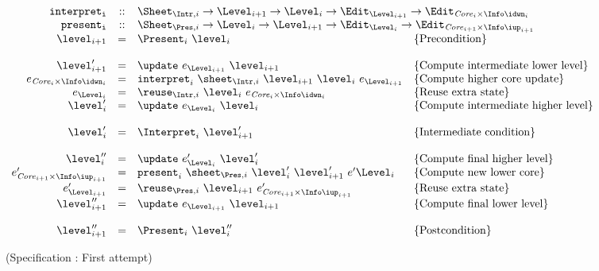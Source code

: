 \begin{small}
 \label{spec:combinationFirstAttempt}
\( \begin{array}{rcll}  
{\tt interpret_i}  & :: & \multicolumn{2}{l}{\Sheet_{\Intr,i} \rightarrow \Level_{i+1} \rightarrow \Level_{i} \rightarrow  \Edit_{\Level_{i+1}} \rightarrow \Edit_{\Core_{i}\times \Info\idwn_{i}} } \\
{\tt present_i} & :: & \multicolumn{2}{l}{ \Sheet_{\Pres,i} \rightarrow \Level_{i} \rightarrow \Level_{i+1}  \rightarrow \Edit_{\Level_{i}} \rightarrow \Edit_{\Core_{i+1}\times \Info\iup_{i+1}} } \\
\level_{i+1} 	& = & \Present_{i}~\level_{i}						& \text{\{Precondition\}}\\
\\
\level'_{i+1} 	& = & \update~e_{\Level_{i+1}}~\level_{i+1}                 & \text{\{Compute intermediate lower level\}}\\
e_{\Core_{i} \times \Info\idwn_{i}}  & = & \interpret_{i}~\sheet_{\Intr,i}~\level_{i+1}~\level_{i}~e_{\Level_{i+1}} & \text{\{Compute higher core update\}}\\
e_{\Level_{i}} & = & \reuse_{\Intr,i}~\level_{i}~e_{\Core_{i}\times \Info\idwn_{i}}     & \text{\{Reuse extra state\}}\\
\level'_{i} & = & \update~e_{\Level_{i}}~\level_{i}                 & \text{\{Compute intermediate higher level\}}\\
\\\
\level'_{i} & = & \Interpret_{i}~\level'_{i+1}						& \text{\{Intermediate condition\}}\\
\\
\level''_{i} & = & \update~e'_{\Level_{i}}~\level'_{i}                 & \text{\{Compute final higher level\}}\\
e'_{\Core_{i+1}\times \Info\iup_{i+1}}  & = & \present_{i}~\sheet_{\Pres,i}~\level'_{i}~\level'_{i+1}~e'{\Level_{i}} & \text{\{Compute new lower core\}}\\
e'_{\Level_{i+1}} & = & \reuse_{\Pres,i}~\level_{i+1}~e'_{\Core_{i+1}\times \Info\iup_{i+1}} & \text{\{Reuse extra state\}}\\
\level''_{i+1} & = & \update~e_{\Level_{i+1}}~\level_{i+1}                 & \text{\{Compute final lower level\}}\\
\\
\level''_{i+1} & = & \Present_{i}~\level''_{i}						& \text{\{Postcondition\}}\\
\end{array}\)
\end{small}
\begin{center}(Specification \thespecification: First attempt)\end{center}\vspace{1em}

